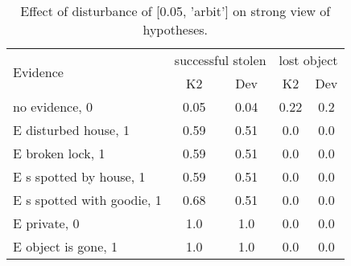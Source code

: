 \begin{table}\begin{tabular}{l|cc|cc}\toprule\multirow{2}{*}{Evidence} & \multicolumn{2}{c}{successful stolen}& \multicolumn{2}{c}{lost object}\\& {K2} & {Dev}& {K2} & {Dev}\\\midrule
no evidence, 0 & 0.05&0.04&0.22&0.2\\E disturbed house, 1 & \cellcolor{Bittersweet}0.59&\cellcolor{Bittersweet}0.51&0.0&0.0\\E broken lock, 1 & \cellcolor{Bittersweet}0.59&\cellcolor{Bittersweet}0.51&0.0&0.0\\E s spotted by house, 1 & \cellcolor{Bittersweet}0.59&\cellcolor{Bittersweet}0.51&0.0&0.0\\E s spotted with goodie, 1 & \cellcolor{Bittersweet}0.68&\cellcolor{Bittersweet}0.51&0.0&0.0\\E private, 0 & 1.0&1.0&0.0&0.0\\E object is gone, 1 & 1.0&1.0&0.0&0.0\\\bottomrule\end{tabular}\caption{Effect of disturbance of [0.05, 'arbit'] on strong view of hypotheses.}\end{table}